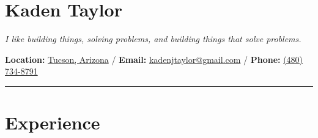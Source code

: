 \documentclass{article}
\begin{document}
\raggedright{\section*{Kaden Taylor}}
\textit{I like building things, solving problems, and building things that solve problems.}
\newline
\begin{center}
\textbf{Location:} \href{https://www.google.com/maps/search/?api=1&query=Tucson+AZ}{Tucson, Arizona} /
\textbf{Email:} \href{mailto:kadenjtaylor@gmail.com}{kadenjtaylor@gmail.com} /
\textbf{Phone:} \href{tel:4807348791}{(480) 734-8791}
\end{center}
\noindent\rule{\linewidth}{1pt}

\raggedright{\section*{Experience}}
\end{document}
